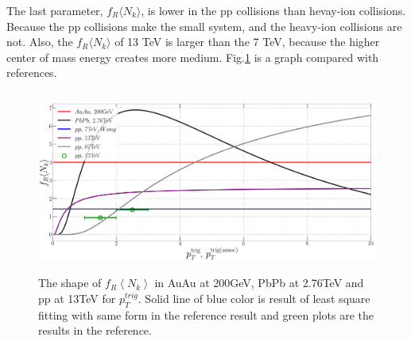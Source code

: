 \documentclass[jkps,fleqn,showpacs,showkeys]{revtex4}
\begin{document}
The last parameter, $f_R \langle N_k \rangle$, is lower in the pp collisions than hevay-ion collisions.
Because the pp collisions make the small system, and the heavy-ion collisions are not.
Also, the $f_R \langle N_k \rangle$ of 13 TeV is larger than the 7 TeV, because the higher center of mass energy creates more medium.
Fig.\ref{figure:frnk} is a graph compared with references\cite{Wong_1, PbPb, Hanul}.






\begin{figure}[ht]
\centering
\includegraphics[width=12cm, height=6cm]{./Figures/Paper_frnk}
\caption{The shape of $f_R \left\langle N_k \right\rangle$ in AuAu at 200GeV, PbPb at 2.76TeV and pp at 13TeV for $p_{T}^{trig}$.
Solid line of blue color is result of least square fitting with same form in the reference\cite{PbPb} result and green plots are the results in the reference\cite{Hanul}.}
\label{figure:frnk}
\end{figure}
\end{document}
